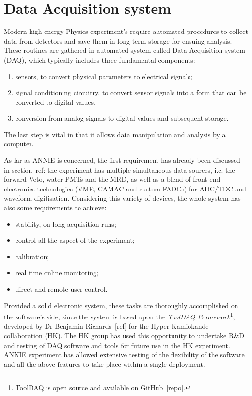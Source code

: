 
\chapter[Data Acquisition]{Data Acquisition system}
\label{cha:3}

Modern high energy Physics experiment's require automated procedures to collect data from detectors %
and save them in long term storage for ensuing analysis.
These routines are gathered in automated system called Data Acquisition system (DAQ), %
which typically includes three fundamental components:
\begin{enumerate}
  \item sensors, to convert physical parameters to electrical signals;
  \item signal conditioning circuitry, to convert sensor signals into a form that %
    can be converted to digital values.
  \item conversion from analog signals to digital values and subsequent storage.
\end{enumerate}
The last step is vital in that it allows data manipulation and analysis by a computer.

As far as ANNIE is concerned, the first requirement has already been discussed in section~ref: %
the experiment has multiple simultaneous data sources, i.e. %
the forward Veto, water PMTs and the MRD, as well as a blend of front-end %
electronics technologies (VME, CAMAC and custom FADCs) for ADC/TDC and waveform digitisation.
Considering this variety of devices, the whole system has also some requirements to achieve:
\begin{itemize}
  \item stability, on long acquisition runs;
  \item control all the aspect of the experiment;
  \item calibration; 	%
  \item real time online monitoring;
  \item direct and remote user control.
\end{itemize}

Provided a solid electronic system, these tasks are thoroughly accomplished on the %
software's side, since the system is based upon the %
\emph{ToolDAQ Framework}\footnote{ToolDAQ %
  is open source and available on GitHub~[repo].}, developed %
by Dr Benjamin Richards~[ref] for the Hyper Kamiokande collaboration (HK).
The HK group has used this opportunity to undertake R\&D and testing of %
DAQ software and tools for future use in the HK experiment.
ANNIE experiment has allowed extensive testing of the flexibility of the software %
and all the above features to take place within a single deployment.

